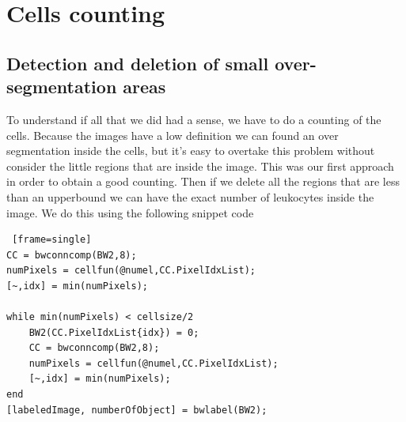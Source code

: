 \section{Cells counting}
\subsection{Detection and deletion of small over-segmentation areas}
To understand if all that we did had a sense, we have to do a counting of the cells. Because the images have a low definition we can found an over segmentation inside the cells, but it's easy to overtake this problem without consider the little regions that are inside the image. This was our first approach in order to obtain a good counting. Then if we delete all the regions that are less than an upperbound we can have the exact number of leukocytes inside the image. We do this using the following snippet code
\bigskip
\begin{minipage}{\linewidth}
\begin{lstlisting} [frame=single]
CC = bwconncomp(BW2,8);
numPixels = cellfun(@numel,CC.PixelIdxList);
[~,idx] = min(numPixels);

while min(numPixels) < cellsize/2
    BW2(CC.PixelIdxList{idx}) = 0;
    CC = bwconncomp(BW2,8);
    numPixels = cellfun(@numel,CC.PixelIdxList);
    [~,idx] = min(numPixels);
end
[labeledImage, numberOfObject] = bwlabel(BW2);
\end{lstlisting}
\end{minipage}
\bigskip

